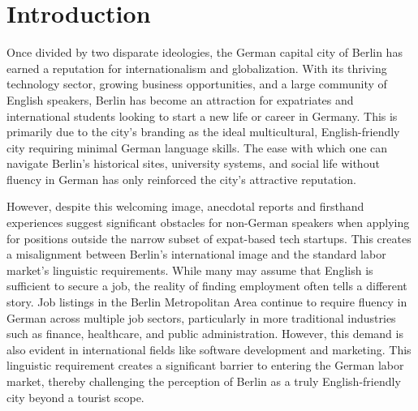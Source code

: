 \titlespacing*{\chapter}{0pt}{0pt}{0pt}

\chapter{Introduction}

Once divided by two disparate ideologies, the German capital city of Berlin has earned a reputation for internationalism and globalization. With its thriving technology sector, growing business opportunities, and a large community of English speakers, Berlin has become an attraction for expatriates and international students looking to start a new life or career in Germany. This is primarily due to the city’s branding as the ideal multicultural, English-friendly city requiring minimal German language skills. The ease with which one can navigate Berlin’s historical sites, university systems, and social life without fluency in German has only reinforced the city’s attractive reputation. 

However, despite this welcoming image, anecdotal reports and firsthand experiences suggest significant obstacles for non-German speakers when applying for positions outside the narrow subset of expat-based tech startups. This creates a misalignment between Berlin’s international image and the standard labor market’s linguistic requirements. While many may assume that English is sufficient to secure a job, the reality of finding employment often tells a different story. Job listings in the Berlin Metropolitan Area continue to require fluency in German across multiple job sectors, particularly in more traditional industries such as finance, healthcare, and public administration. However, this demand is also evident in international fields like software development and marketing. This linguistic requirement creates a significant barrier to entering the German labor market, thereby challenging the perception of Berlin as a truly English-friendly city beyond a tourist scope.

